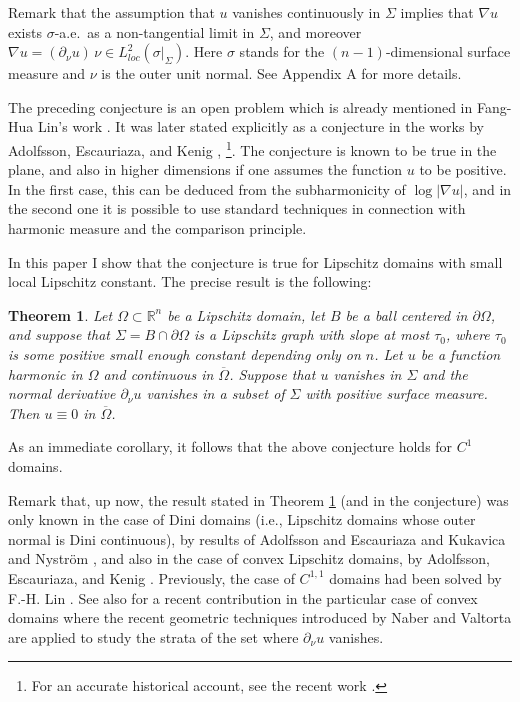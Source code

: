 \documentclass[11pt]{amsart}
\newcommand{\R}{{\mathbb R}}       %
\newtheorem{theorem}{Theorem}[section]
\theoremstyle{definition}
\theoremstyle{remark}
\numberwithin{equation}{section}
\begin{document}
Remark that the assumption that
$u$ vanishes continuously in $\Sigma$ implies that $\nabla u$ exists $\sigma$-a.e.\ as a non-tangential
limit in $\Sigma$, and moreover $\nabla u = (\partial_\nu u)\,\nu \in L^2_{loc}(\sigma|_\Sigma)$. Here
 $\sigma$ stands for the  $(n-1)$-dimensional surface measure and $\nu$ is the outer unit normal. See Appendix A for more details.
 
The preceding conjecture is an open problem which is already mentioned in Fang-Hua Lin's work \cite{Lin}. It was later stated explicitly as a conjecture in the works by Adolfsson, Escauriaza, and Kenig
\cite{AEK}, \cite{AE}\footnote{
For an accurate historical account, see the recent work \cite{Kenig-Zhao}.}.
 The conjecture is known to be true in the plane, and also in higher dimensions if one assumes the function $u$ to be positive. In the first case, this can be deduced from the subharmonicity of $\log|\nabla u|$, and in the second one it is possible to use standard techniques in connection with harmonic measure and the comparison principle. 

In this paper I show that the conjecture is true for Lipschitz domains with small local Lipschitz constant.
The precise result is the following:


\begin{theorem}\label{teomain}
Let $\Omega\subset\R^n$ be a Lipschitz domain, let $B$ be a ball centered in $\partial\Omega$,
and suppose that $\Sigma = B\cap \partial\Omega$ is a Lipschitz graph with slope at most $\tau_0$,
where $\tau_0$ is some positive small enough constant depending only on $n$. 
Let $u$ be a function harmonic in $\Omega$ and continuous in $\overline\Omega$. Suppose that $u$  vanishes in $\Sigma$ and the normal derivative $\partial_\nu u$ vanishes
in a subset of $\Sigma$ with positive surface measure. Then $u\equiv0$ in $\overline\Omega$.
\end{theorem}

As an immediate corollary, it follows that the above conjecture holds for $C^1$ domains.

Remark that, up now, the result stated in Theorem \ref{teomain} (and in the conjecture) was only known in the
case of Dini domains (i.e., Lipschitz domains whose outer normal is Dini continuous), by results of
 Adolfsson and Escauriaza \cite{AE} and Kukavica and Nystr\"om \cite{KN}, and also in the
case of convex Lipschitz domains, by Adolfsson, Escauriaza, and Kenig \cite{AEK}. 
Previously, the case of $C^{1,1}$ domains had been solved by F.-H. Lin \cite{Lin}. See also \cite{MC}
for a recent contribution in the particular case of convex domains where the 
recent geometric techniques introduced by Naber and Valtorta \cite{NV} are applied to study the strata of the set where $\partial_\nu u$ vanishes.
\end{document}
